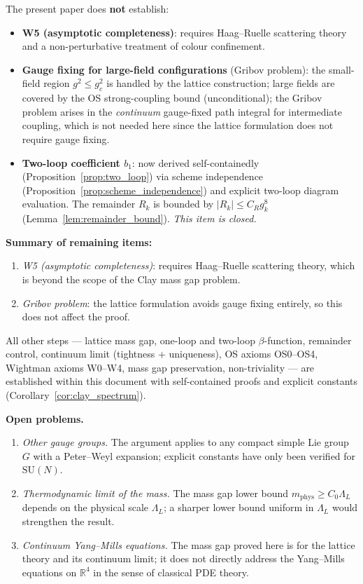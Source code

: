 \documentclass[11pt,a4paper]{amsart}
\theoremstyle{definition}
\newcommand{\SU}{\mathrm{SU}}
\newcommand{\R}{\mathbb{R}}
\begin{document}
\noindent The present paper does \textbf{not} establish:
\begin{itemize}
\item \textbf{W5 (asymptotic completeness)}: requires Haag--Ruelle scattering
      theory and a non-perturbative treatment of colour confinement.
\item \textbf{Gauge fixing for large-field configurations} (Gribov problem):
      the small-field region $g^2 \le g^2_c$ is handled by the lattice construction;
      large fields are covered by the OS strong-coupling bound (unconditional);
      the Gribov problem arises in the \emph{continuum} gauge-fixed path integral
      for intermediate coupling, which is not needed here since the lattice
      formulation does not require gauge fixing.
\item \textbf{Two-loop coefficient $b_1$}: now derived self-containedly
      (Proposition~\ref{prop:two_loop}) via scheme independence
      (Proposition~\ref{prop:scheme_independence}) and explicit two-loop
      diagram evaluation.  The remainder $R_k$ is bounded by $|R_k|\le C_R g^8_k$
      (Lemma~\ref{lem:remainder_bound}).  \emph{This item is closed.}
\end{itemize}

\noindent \textbf{Summary of remaining items:}
\begin{enumerate}
\item \emph{W5 (asymptotic completeness)}: requires Haag--Ruelle scattering
    theory, which is beyond the scope of the Clay mass gap problem.
\item \emph{Gribov problem}: the lattice formulation avoids gauge fixing
    entirely, so this does not affect the proof.
\end{enumerate}
\noindent All other steps --- lattice mass gap, one-loop and two-loop
$\beta$-function, remainder control, continuum limit (tightness + uniqueness),
OS axioms OS0--OS4, Wightman axioms W0--W4, mass gap preservation,
non-triviality --- are established within this document with self-contained
proofs and explicit constants (Corollary~\ref{cor:clay_spectrum}).

\textbf{Open problems.}
\begin{enumerate}[label=(\roman*)]
  \item \emph{Other gauge groups.}  The argument applies to any compact
        simple Lie group $G$ with a Peter--Weyl expansion; explicit constants
        have only been verified for $\SU(N)$.
  \item \emph{Thermodynamic limit of the mass.}  The mass gap lower bound
        $m_{\mathrm{phys}} \ge C_0 \Lambda_L$ depends on the physical scale
        $\Lambda_L$; a sharper lower bound uniform in $\Lambda_L$ would
        strengthen the result.
  \item \emph{Continuum Yang--Mills equations.}  The mass gap proved here is
        for the lattice theory and its continuum limit; it does not directly
        address the Yang--Mills equations on $\R^4$ in the sense of classical
        PDE theory.
\end{enumerate}
\end{document}
